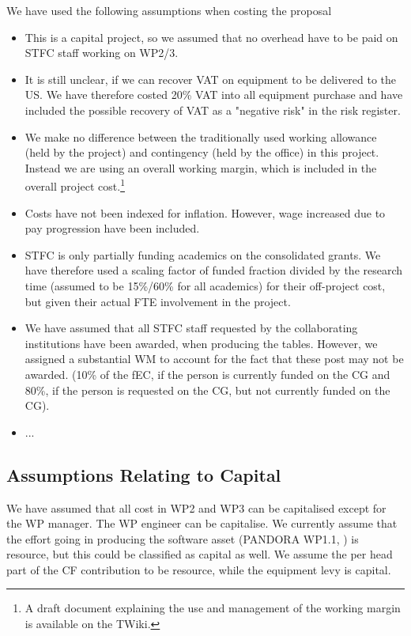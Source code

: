 We have used the following assumptions when costing the proposal
\begin{itemize}
    \item This is a capital project, so we assumed that no overhead have to be paid on STFC staff working on WP2/3. 
    \item It is still unclear, if we can recover VAT on equipment to be delivered to the US. We have therefore costed 20\% VAT into all equipment purchase and have included the possible recovery of VAT as a "negative risk" in the risk register.
    \item We make no difference between the traditionally used working allowance (held by the project) and contingency (held by the office) in this project. Instead we are using an overall working margin, which is included in the overall project cost.\footnote{A draft document explaining the use and management of the working margin is available on the TWiki.}
    \item Costs have not been indexed for inflation. However, wage increased due to pay progression have been included.
    \item STFC is only partially funding academics on the consolidated grants. We have therefore used a scaling factor of funded fraction divided by the research time (assumed to be 15\%/60\% for all academics) for their off-project cost, but given their actual FTE involvement in the project.
    \item We have assumed that all STFC staff requested by the collaborating institutions have been awarded, when producing the tables. However, we assigned a substantial WM to account for the fact that these post may not be awarded. (10\% of the fEC, if the person is currently funded on the CG and 80\%, if the person is requested on the CG, but not currently funded on the CG).
    \item ...
\end{itemize}

\subsection{Assumptions Relating to Capital}

We have assumed that all cost in WP2 and WP3 can be capitalised except for the WP manager. The WP engineer can be capitalise. We currently assume that the effort going in producing the software asset (PANDORA WP1.1, ) is resource, but this could be classified as capital as well. We assume the per head part of the CF contribution to be resource, while the equipment levy is capital.


